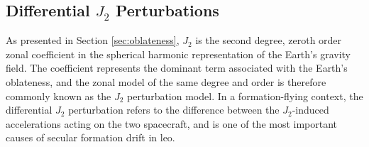 \subsection{Differential $J_2$ Perturbations}

As presented in Section \ref{sec:oblateness}, $J_2$ is the second degree, zeroth order zonal coefficient in the spherical harmonic representation of the Earth's gravity field. The coefficient represents the dominant term associated with the Earth's oblateness, and the zonal model of the same degree and order is therefore commonly known as the $J_2$ perturbation model. In a formation-flying context, the differential $J_2$ perturbation refers to the difference between the $J_2$-induced accelerations acting on the two spacecraft, and is one of the most important causes of secular formation drift in \gls{leo}. 

